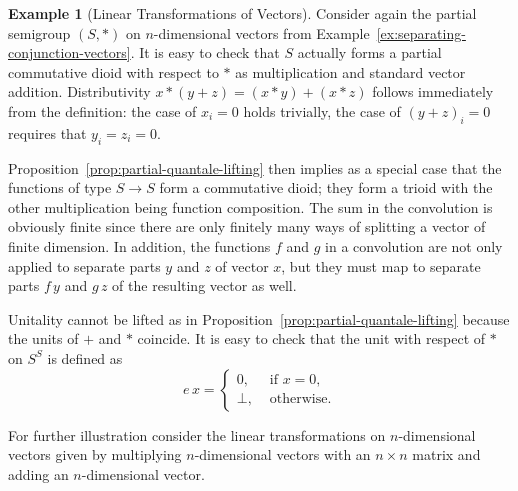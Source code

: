 \documentclass[12pt]{article}
\theoremstyle{definition}
\newtheorem{example}{Example}
\begin{document}
\begin{example}[Linear Transformations of Vectors]\label{ex:lin-trafos}
  Consider again the partial semigroup $(S,\ast)$ on $n$-dimensional
  vectors from Example~\ref{ex:separating-conjunction-vectors}. It is
  easy to check that $S$ actually forms a partial commutative dioid
  with respect to $\ast$ as multiplication and standard vector
  addition. Distributivity $x\ast(y+z)=(x\ast y)+(x\ast z)$ follows
  immediately from the definition: the case of $x_i=0$ holds
  trivially, the case of $(y+z)_i=0$ requires that $y_i=z_i=0$.

  Proposition~\ref{prop:partial-quantale-lifting} then implies as a
  special case that the functions of type $S\to S$ form a commutative
  dioid; they form a trioid with the other multiplication being
  function composition. The sum in the convolution is obviously finite
  since there are only finitely many ways of splitting a vector of
  finite dimension.  In addition, the functions $f$ and $g$ in a
  convolution are not only applied to separate parts $y$ and $z$ of
  vector $x$, but they must map to separate parts $f\, y$ and $g\, z$ of
  the resulting vector as well.

  Unitality cannot be lifted as in
  Proposition~\ref{prop:partial-quantale-lifting} because the units of
  $+$ and $\ast$ coincide. It is easy to check that the unit with
  respect of $\ast$ on $S^S$ is defined as
\begin{equation*}
  e\, x = 
  \begin{cases}
    0, & \text{ if } x=0,\\
    \bot, & \text{ otherwise}.
  \end{cases}
\end{equation*}

For further illustration consider the linear transformations on
$n$-dimensional vectors given by multiplying $n$-dimensional vectors
with an $n\times n$ matrix and adding an $n$-dimensional vector.


\end{example}
\end{document}
